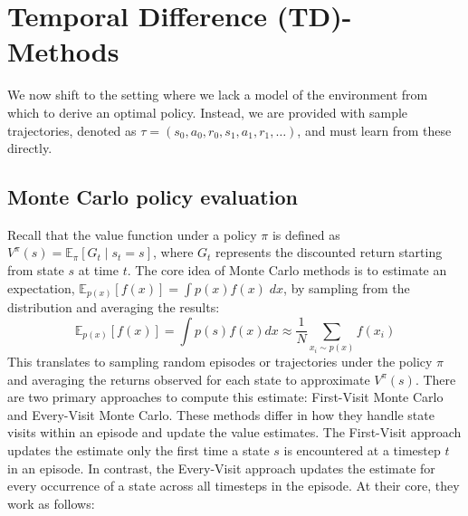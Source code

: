 \section{Temporal Difference (TD)- Methods}\label{section:td-methods}
We now shift to the setting where we lack a model of the environment from which to derive 
an optimal policy. Instead, we are provided with sample trajectories, denoted as 
$\tau = (s_0, a_0, r_0, s_1, a_1, r_1, \dots)$, and must learn from these directly.

\subsection{Monte Carlo policy evaluation}\label{Monte Carlo policy evaluation}
Recall that the value function under a policy $\pi$ is defined as 
$V^{\pi}(s) = \mathbb{E}_{\pi}\left[G_t \mid s_t = s\right]$, where $G_t$ represents 
the discounted return starting from state $s$ at time $t$. The core idea of Monte 
Carlo methods is to estimate an expectation, $\mathbb{E}_{p(x)}\left[f(x)\right] = \int p(x) f(x) \; dx$, 
by sampling from the distribution and averaging the results:
$$\mathbb{E}_{p(x)}\left[f(x)\right] = \int p(s)f(x) dx \approx \frac{1}{N} 
\sum_{x_i \sim p(x)} f(x_i)$$
This translates to sampling random episodes or trajectories under the policy $\pi$ 
and averaging the returns observed for each state to approximate $V^{\pi}(s)$. 
There are two primary approaches to compute this estimate: First-Visit Monte Carlo and Every-Visit Monte Carlo.
These methods differ in how they handle state visits within an episode and update the value estimates. 
The First-Visit approach updates the estimate only the first time a state $s$ is encountered at a timestep $t$ 
in an episode. In contrast, the Every-Visit approach updates the estimate for every occurrence of a 
state across all timesteps in the episode. At their core, they work as follows:

